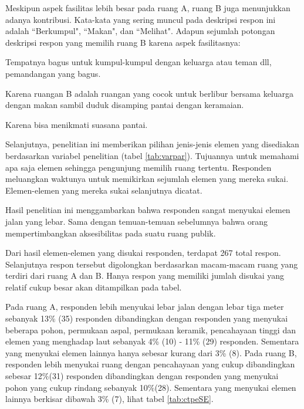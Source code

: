 \documentclass[11pt]{udthesis} %
\begin{document}
Meskipun aspek fasilitas lebih besar pada ruang A, ruang B juga menunjukkan adanya kontribusi. Kata-kata yang sering muncul pada deskripsi respon ini adalah ``Berkumpul", ``Makan", dan ``Melihat". Adapun sejumlah potongan deskripsi respon yang memilih ruang B karena aspek fasilitasnya:

\begin{quoting}
    Tempatnya bagus untuk kumpul-kumpul dengan keluarga atau teman dll, pemandangan yang bagus.
\end{quoting}

\begin{quoting}
   Karena ruangan B adalah ruangan yang cocok untuk berlibur bersama keluarga dengan makan sambil duduk disamping pantai dengan keramaian.
\end{quoting}

\begin{quoting}
    Karena bisa menikmati suasana pantai.
\end{quoting}

Selanjutnya, penelitian ini memberikan pilihan jenis-jenis elemen yang disediakan berdasarkan variabel penelitian (tabel \ref{tab:varpar}). Tujuannya untuk memahami apa saja elemen sehingga pengunjung memilih ruang tertentu. Responden meluangkan waktunya untuk memikirkan sejumlah elemen yang mereka sukai. Elemen-elemen yang mereka sukai selanjutnya dicatat.

Hasil penelitian ini menggambarkan bahwa responden sangat menyukai elemen jalan yang lebar. Sama dengan temuan-temuan sebelumnya bahwa orang mempertimbangkan aksesibilitas pada suatu ruang publik.

Dari hasil elemen-elemen yang disukai responden, terdapat 267 total respon. Selanjutnya respon tersebut digolongkan berdasarkan macam-macam ruang yang terdiri dari ruang A dan B. Hanya respon yang memiliki jumlah disukai yang relatif cukup besar akan ditampilkan pada tabel.

Pada ruang A, responden lebih menyukai lebar jalan dengan lebar tiga meter sebanyak 13\% (35) responden dibandingkan dengan responden yang menyukai beberapa pohon, permukaan aspal, permukaan keramik, pencahayaan tinggi dan elemen yang menghadap laut sebanyak 4\% (10) - 11\% (29) responden. Sementara yang menyukai elemen lainnya hanya sebesar kurang dari 3\% (8). Pada ruang B, responden lebih menyukai ruang dengan pencahayaan yang cukup dibandingkan sebesar 12\%(31) responden dibandingkan dengan responden yang menyukai pohon yang cukup rindang sebanyak 10\%(28). Sementara yang menyukai elemen lainnya berkisar dibawah 3\% (7), lihat tabel \ref{tab:ctpeSE}.
\end{document}
